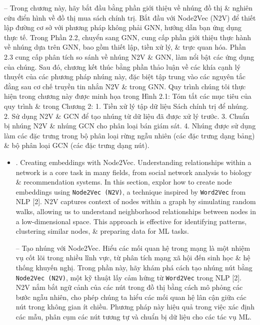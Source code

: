 \documentclass{article}
\begin{document}
\begin{itemize}
    -- Trong chương này, hãy bắt đầu bằng phần giới thiệu về nhúng đồ thị \& nghiên cứu điển hình về đồ thị mua sách chính trị. Bắt đầu với Node2Vec (N2V) để thiết lập đường cơ sở với phương pháp không phải GNN, hướng dẫn bạn ứng dụng thực tế. Trong Phần 2.2, chuyển sang GNN, cung cấp phần giới thiệu thực hành về nhúng dựa trên GNN, bao gồm thiết lập, tiền xử lý, \& trực quan hóa. Phần 2.3 cung cấp phân tích so sánh về nhúng N2V \& GNN, làm nổi bật các ứng dụng của chúng. Sau đó, chương kết thúc bằng phần thảo luận về các khía cạnh lý thuyết của các phương pháp nhúng này, đặc biệt tập trung vào các nguyên tắc đằng sau cơ chế truyền tin nhắn N2V \& trong GNN. Quy trình chúng tôi thực hiện trong chương này được minh họa trong {\sf Hình 2.1: Tóm tắt các mục tiêu của quy trình \& trong Chương 2: 1. Tiền xử lý tập dữ liệu Sách chính trị để nhúng. 2. Sử dụng N2V \& GCN để tạo nhúng từ dữ liệu đã được xử lý trước. 3. Chuẩn bị nhúng N2V \& nhúng GCN cho phân loại bán giám sát. 4. Nhúng được sử dụng làm các đặc trưng trong bộ phân loại rừng ngẫu nhiên (các đặc trưng dạng bảng) \& bộ phân loại GCN (các đặc trưng dạng nút).}
    \begin{itemize}
        \item {. Creating embeddings with Node2Vec.} Understanding relationships within a network is a core task in many fields, from social network analysis to biology \& recommendation systems. In this section, explor how to create node embeddings using {\tt Node2Vec (N2V)}, a technique inspired by {\tt Word2Vec} from NLP [2]. N2V captures context of nodes within a graph by simulating random walks, allowing us to understand neighborhood relationships between nodes in a low-dimensional space. This approach is effective for identifying patterns, clustering similar nodes, \& preparing data for ML tasks.

        -- {\sf Tạo nhúng với Node2Vec.} Hiểu các mối quan hệ trong mạng là một nhiệm vụ cốt lõi trong nhiều lĩnh vực, từ phân tích mạng xã hội đến sinh học \& hệ thống khuyến nghị. Trong phần này, hãy khám phá cách tạo nhúng nút bằng {\tt Node2Vec (N2V)}, một kỹ thuật lấy cảm hứng từ {\tt Word2Vec} trong NLP [2]. N2V nắm bắt ngữ cảnh của các nút trong đồ thị bằng cách mô phỏng các bước ngẫu nhiên, cho phép chúng ta hiểu các mối quan hệ lân cận giữa các nút trong không gian ít chiều. Phương pháp này hiệu quả trong việc xác định các mẫu, phân cụm các nút tương tự và chuẩn bị dữ liệu cho các tác vụ ML.


\end{itemize}
\end{itemize}
\end{document}

